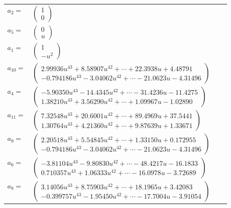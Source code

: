 \documentclass[1p]{elsarticle_modified}
\theoremstyle{definition}
\begin{document}
\begin{tabular}{m{7pt} m{180pt} m{7pt} m{180pt} }
\flushright $a_{2}=$&$\begin{pmatrix}1\\0\end{pmatrix}$ \\
\flushright $a_{5}=$&$\begin{pmatrix}0\\u\end{pmatrix}$ \\
\flushright $a_{1}=$&$\begin{pmatrix}1\\- u^2\end{pmatrix}$ \\
\flushright $a_{10}=$&$\begin{pmatrix}2.99936 u^{43}+8.58907 u^{42}+\cdots+22.3938 u+4.48791\\-0.794186 u^{43}-3.04062 u^{42}+\cdots-21.0623 u-4.31496\end{pmatrix}$ \\
\flushright $a_{4}=$&$\begin{pmatrix}-5.90350 u^{43}-14.4345 u^{42}+\cdots-31.4236 u-11.4275\\1.38210 u^{43}+3.56290 u^{42}+\cdots+1.09967 u-1.02890\end{pmatrix}$ \\
\flushright $a_{11}=$&$\begin{pmatrix}7.32548 u^{43}+20.6001 u^{42}+\cdots+89.4969 u+37.5441\\1.30764 u^{43}+4.21360 u^{42}+\cdots+9.87639 u+1.33671\end{pmatrix}$ \\
\flushright $a_{9}=$&$\begin{pmatrix}2.20518 u^{43}+5.54845 u^{42}+\cdots+1.33150 u+0.172955\\-0.794186 u^{43}-3.04062 u^{42}+\cdots-21.0623 u-4.31496\end{pmatrix}$ \\
\flushright $a_{6}=$&$\begin{pmatrix}-3.81104 u^{43}-9.80830 u^{42}+\cdots-48.4217 u-16.1833\\0.710357 u^{43}+1.06333 u^{42}+\cdots-16.0978 u-3.72689\end{pmatrix}$ \\
\flushright $a_{8}=$&$\begin{pmatrix}3.14056 u^{43}+8.75903 u^{42}+\cdots+18.1965 u+3.42083\\-0.399757 u^{43}-1.95450 u^{42}+\cdots-17.7004 u-3.91054\end{pmatrix}$ \\

\end{tabular}
\end{document}
